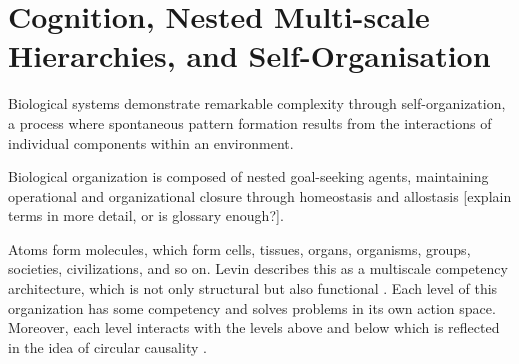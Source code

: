 




\section{Cognition, Nested Multi-scale Hierarchies, and Self-Organisation}

Biological systems demonstrate remarkable complexity through self-organization, a process where spontaneous pattern formation results from the interactions of individual components within an environment. 

Biological organization is composed of nested goal-seeking agents, maintaining operational and organizational closure through homeostasis and allostasis \cite{ciaunica_nested_2023, vernon_embodied_2015} [explain terms in more detail, or is glossary enough?].

Atoms form molecules, which form cells, tissues, organs, organisms, groups, societies, civilizations, and so on. Levin describes this as a multiscale competency architecture, which is not only structural but also functional \cite{Levin_2023}. Each level of this organization has some competency and solves problems in its own action space. Moreover, each level interacts with the levels above and below which is reflected in the idea of circular causality \cite{ciaunica_nested_2023, vernon_embodied_2015}. 






